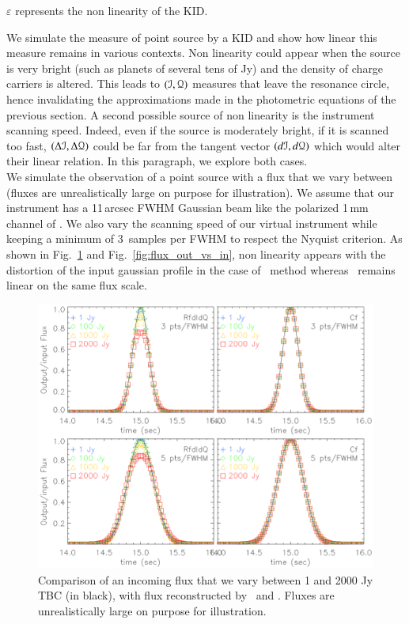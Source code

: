 $\varepsilon$ represents the non linearity of the KID.


We simulate
the measure of point source by a KID and show how linear this measure remains in
various contexts. Non linearity could appear when the source is very bright
(such as planets of several tens of Jy) and the density of charge carriers is
altered. This leads to $(\mathcal{I},\mathcal{Q})$ measures that leave the resonance circle, hence
invalidating the approximations made in the photometric equations of the
previous section. A second possible source of non linearity is the instrument
scanning speed. Indeed, even if the source is moderately bright, if it is
scanned too fast, $(\Delta\mathcal{I},\Delta\mathcal{Q})$ could be far from the tangent vector
$(d\mathcal{I},d\mathcal{Q})$ which would alter their linear relation. In this paragraph, we
explore both cases.\\

We simulate the observation of a point source with a flux
that we vary between  (fluxes are unrealistically large on purpose for illustration). We assume that our instrument has
a 11\,arcsec FWHM Gaussian beam like the polarized 1\,mm channel of \nikad. We
also vary the scanning speed of our virtual instrument while keeping a minimum
of 3~samples per FWHM to respect the Nyquist criterion.
As shown in Fig.~\ref{fig:planet_profiles} and Fig.~\ref{fig:flux_out_vs_in}, non linearity appears with the distortion of the input gaussian profile in the case of \rf\ method whereas \cf\ remains linear on the same flux scale.

\begin{figure}
  \includegraphics[clip, angle=0, width=\columnwidth]{Figures/planet_profiles.eps}
  \caption{Comparison of an incoming flux that we vary between 1 and 2000 Jy TBC (in black), with flux reconstructed by \rf\ and \cf. Fluxes are unrealistically large on purpose for illustration. }
  \label{fig:planet_profiles}
\end{figure}


